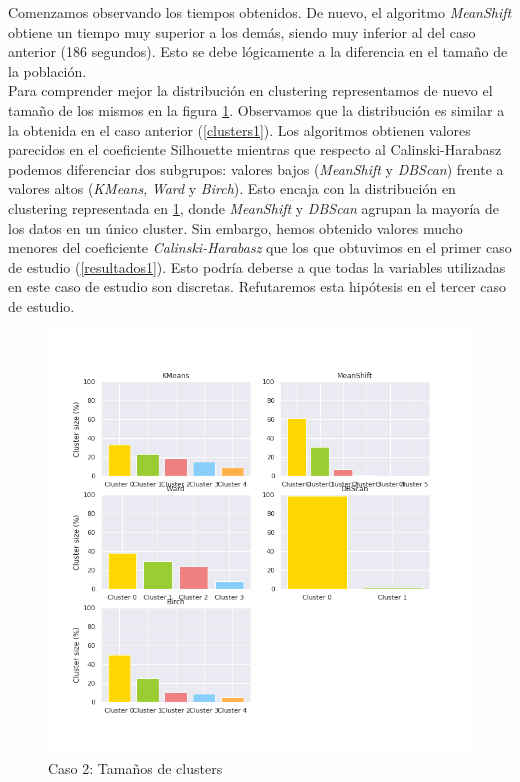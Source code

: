 \documentclass[11pt,a4paper]{article}
\begin{document}
	Comenzamos observando los tiempos obtenidos. De nuevo, el algoritmo \emph{MeanShift} obtiene un tiempo muy superior a los demás, siendo muy inferior al del caso anterior (186 segundos). Esto se debe lógicamente a la diferencia en el tamaño de la población. \\
	
	Para comprender mejor la distribución en clustering representamos de nuevo el tamaño de los mismos en la figura \ref{clusters2}. Observamos que la distribución es similar a la obtenida en el caso anterior (\ref{clusters1}). Los algoritmos obtienen valores parecidos en el coeficiente Silhouette mientras que respecto al Calinski-Harabasz podemos diferenciar dos subgrupos: valores bajos (\emph{MeanShift} y \emph{DBScan}) frente a valores altos (\emph{KMeans}, \emph{Ward} y \emph{Birch}). Esto encaja con la distribución en clustering representada en \ref{clusters2}, donde \emph{MeanShift} y \emph{DBScan} agrupan la mayoría de los datos en un único cluster. Sin embargo, hemos obtenido valores mucho menores del coeficiente \emph{Calinski-Harabasz} que los que obtuvimos en el primer caso de estudio (\ref{resultados1}). Esto podría deberse a que todas la variables utilizadas en este caso de estudio son discretas. Refutaremos esta hipótesis en el tercer caso de estudio. \\
	
	\begin{figure}[] 
		\centering
		\includegraphics[scale=0.4]{../Caso2/clusters}
		\caption{Caso 2: Tamaños de clusters} \label{clusters2}
	\end{figure}
	
\end{document}
